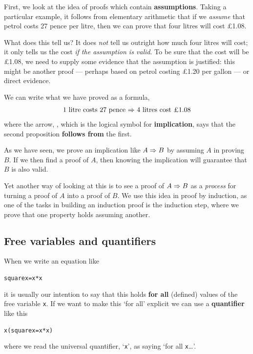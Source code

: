 \newcommand{\poundSymbol}{\symbol{163}}

First, we look at the idea of proofs
which contain {\bf assumptions}.
Taking a particular example,
it follows from elementary arithmetic
that 
if we {\em assume\/} that petrol costs 27 pence per litre,
then we can prove that four litres will cost \pounds 1.08. 

What does this tell us? It does {\em not\/} tell us outright how much four
litres will cost; it only tells us the cost {\em if the assumption is valid}. To be
sure that
the cost will be \pounds 1.08, we need to supply some evidence that the
assumption is justified: this might be another proof --- perhaps based on
petrol costing \pounds 1.20 per gallon --- or direct evidence.

We can write what we have proved as a formula,
\[
\mbox{1 litre costs 27 pence \imp\ 4 litres cost \pounds 1.08}
\index{\imp@{\imp}}
\]
where the arrow, \imp, which is the logical symbol for
\textbf{implication},
says that the second proposition
\textbf{follows from} the first. 

As we have seen, we prove an implication like $A\Rightarrow{}B$ by
assuming $A$ in proving $B$. If we then find a proof of $A$, then knowing the implication
will guarantee that $B$ is also valid. 

Yet another way of looking at this is to
see a proof of $A\Rightarrow{}B$ as a \emph{process} for turning a proof of $A$
into a proof of $B$.
We use this idea in proof by induction, as one of the tasks in building an
induction proof is the induction step, where we prove that one property
holds assuming another. 

\subsection*{Free variables and quantifiers}

When we write an equation like
\begin{alltt}
square x = x*x
\end{alltt}
it is usually our intention to say that this holds \textbf{for all} (defined)
values of the free variable \texttt{x}. If we want to make this `for all' explicit we can
use a \textbf{quantifier} like this
\begin{alltt}
\all{}x (square x = x*x)
\end{alltt}
where we read the universal quantifier, `\texttt{\all{}x}', as saying
`for all \texttt{x}\ldots'.

